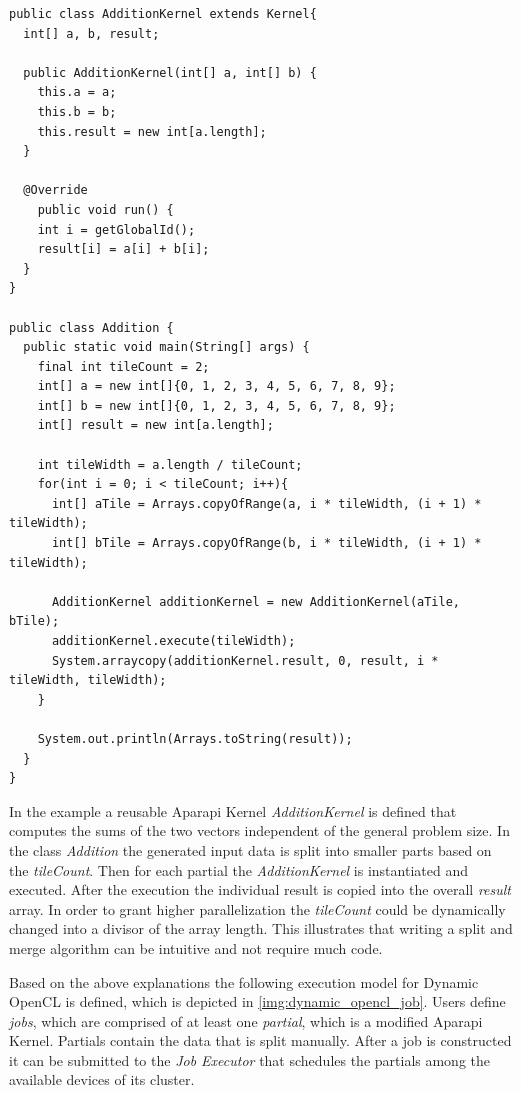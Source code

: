 \begin{lstlisting}
public class AdditionKernel extends Kernel{
  int[] a, b, result;

  public AdditionKernel(int[] a, int[] b) {
    this.a = a;
    this.b = b;
    this.result = new int[a.length];
  }

  @Override
    public void run() {
    int i = getGlobalId();
    result[i] = a[i] + b[i];
  }
}

public class Addition {
  public static void main(String[] args) {
    final int tileCount = 2;
    int[] a = new int[]{0, 1, 2, 3, 4, 5, 6, 7, 8, 9};
    int[] b = new int[]{0, 1, 2, 3, 4, 5, 6, 7, 8, 9};
    int[] result = new int[a.length];

    int tileWidth = a.length / tileCount;
    for(int i = 0; i < tileCount; i++){
      int[] aTile = Arrays.copyOfRange(a, i * tileWidth, (i + 1) * tileWidth);
      int[] bTile = Arrays.copyOfRange(b, i * tileWidth, (i + 1) * tileWidth);

      AdditionKernel additionKernel = new AdditionKernel(aTile, bTile);
      additionKernel.execute(tileWidth);
      System.arraycopy(additionKernel.result, 0, result, i * tileWidth, tileWidth);
    }

    System.out.println(Arrays.toString(result));
  }
}

\end{lstlisting}

In the example a reusable Aparapi Kernel \textit{AdditionKernel} is defined that computes the sums of the two vectors independent of the general problem size. In the class \textit{Addition} the generated input data is split into smaller parts based on the \textit{tileCount}. Then for each partial the \textit{AdditionKernel} is instantiated and executed. After the execution the individual result is copied into the overall \textit{result} array. In order to grant higher parallelization the \textit{tileCount} could be dynamically changed into a divisor of the array length. This illustrates that writing a split and merge algorithm can be intuitive and not require much code.

Based on the above explanations the following execution model for Dynamic OpenCL is defined, which is depicted in \ref{img:dynamic_opencl_job}. Users define \textit{jobs}, which are comprised of at least one \textit{partial}, which is a modified Aparapi Kernel. Partials contain the data that is split manually. After a job is constructed it can be submitted to the \textit{Job Executor} that schedules the partials among the available devices of its cluster.

